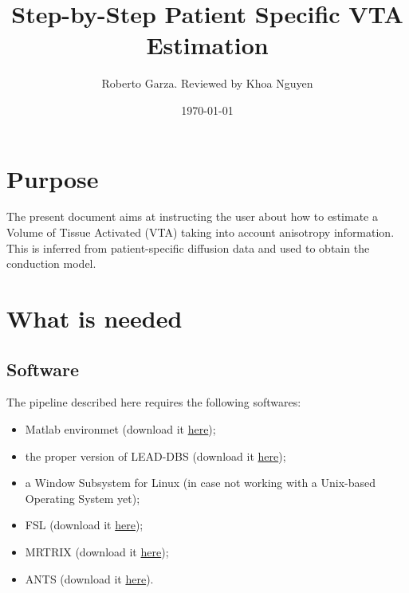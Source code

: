 \documentclass[a4paper,11pt]{article}
\begin{document}
\author{Roberto Garza. Reviewed by Khoa Nguyen}
\date{\today}
\title{Step-by-Step Patient Specific VTA Estimation}

\maketitle

\section{Purpose}

The present document aims at instructing the user about how to estimate a Volume of Tissue Activated (VTA) taking into account anisotropy information. This is inferred from patient-specific diffusion data and used to obtain the conduction model.

\section{What is needed}

\subsection{Software}

The pipeline described here requires the following softwares:
\begin{itemize}
\item Matlab environmet (download it \href{https://it.mathworks.com/downloads/}{here});
\item the proper version of LEAD-DBS (download it \href{https://github.com/CaprioloSaggio/leaddbs}{here});
\item a Window Subsystem for Linux (in case not working with a Unix-based Operating System yet);
\item FSL (download it \href{https://fsl.fmrib.ox.ac.uk/fsldownloads_registration}{here});
\item MRTRIX (download it \href{https://www.mrtrix.org/download/}{here});
\item ANTS (download it \href{https://github.com/ANTsX/ANTs}{here}).
\end{itemize}
\end{document}
